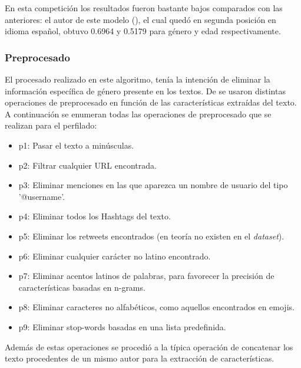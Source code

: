 En esta competición los resultados fueron bastante bajos comparados con las anteriores: el autor de este modelo (\cite{modaresi:2016}), el cual quedó en segunda posición en idioma español, obtuvo 0.6964 y 0.5179 para género y edad respectivamente.

\subsubsection{Preprocesado}
El procesado realizado en este algoritmo, tenía la intención de eliminar la información específica de género presente en los textos. De se usaron distintas operaciones de preprocesado en función de las características extraídas del texto. A continuación se enumeran todas las operaciones de preprocesado que se realizan para el perfilado:
\begin{itemize}
    \item p1: Pasar el texto a minúsculas.
    \item p2: Filtrar cualquier URL encontrada.
    \item p3: Eliminar menciones en las que aparezca un nombre de usuario del tipo '@username'.
    \item p4: Eliminar todos los Hashtags del texto.
    \item p5: Eliminar los retweets encontrados (en teoría no existen en el \textit{dataset}).
    \item p6: Eliminar cualquier carácter no latino encontrado.
    \item p7: Eliminar acentos latinos de palabras, para favorecer la precisión de características basadas en n-grams.
    \item p8: Eliminar caracteres no alfabéticos, como aquellos encontrados en emojis.
    \item p9: Eliminar stop-words basadas en una lista predefinida. 
\end{itemize}
Además de estas operaciones se procedió a la típica operación de concatenar los texto procedentes de un mismo autor para la extracción de características.

